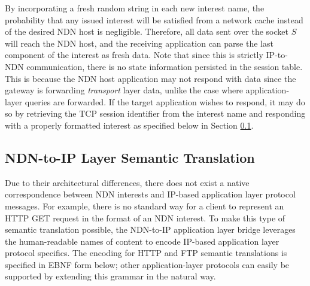 %
By incorporating a fresh random string in each new interest name, the probability that any issued interest will be satisfied from a network cache instead of the desired NDN host is negligible. Therefore, all data sent over the socket $S$ will reach the NDN host, and the receiving application can parse the last component of the interest as fresh data. Note that since this is strictly IP-to-NDN communication, there is no state information persisted in the session table. This is because the NDN host application may not respond with data since the gateway is forwarding \emph{transport} layer data, unlike the case where application-layer queries are forwarded. If the target application wishes to respond, it may do so by retrieving the TCP session identifier from the interest name and responding with a properly formatted interest as specified below in Section \ref{sec:ndn-to-ip}.


\subsection{NDN-to-IP Layer Semantic Translation}\label{sec:ndn-to-ip}
Due to their architectural differences, there does not exist a native correspondence between NDN interests and IP-based application layer protocol messages. For example, there is no standard way for a client to represent an HTTP GET request in the format of an NDN interest. To make this type of semantic translation possible, the NDN-to-IP application layer bridge leverages the human-readable names of content to encode IP-based application layer protocol specifics. The encoding for HTTP and FTP semantic translations is specified in EBNF form below; other application-layer protocols can easily be supported by extending this grammar in the natural way.


